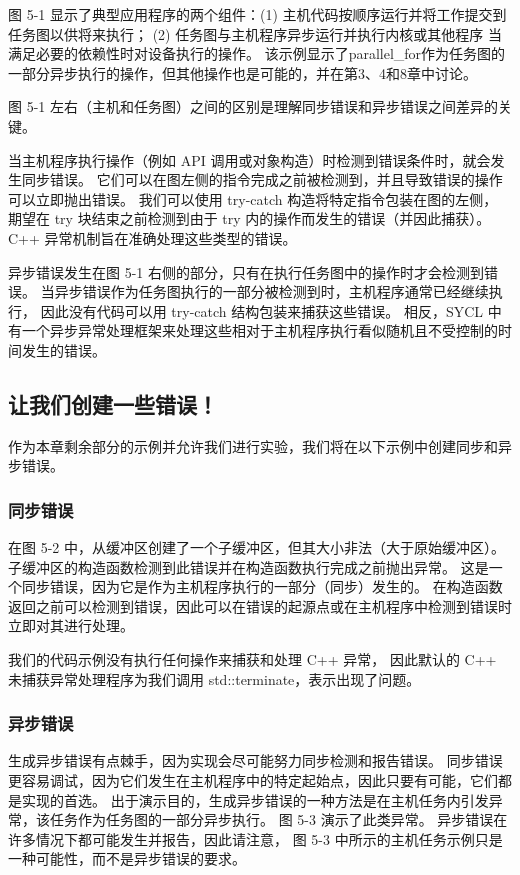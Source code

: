 图 5-1 显示了典型应用程序的两个组件：(1) 主机代码按顺序运行并将工作提交到任务图以供将来执行；
(2) 任务图与主机程序异步运行并执行内核或其他程序 当满足必要的依赖性时对设备执行的操作。 
该示例显示了parallel\_for作为任务图的一部分异步执行的操作，但其他操作也是可能的，并在第3、4和8章中讨论。

图 5-1 左右（主机和任务图）之间的区别是理解同步错误和异步错误之间差异的关键。

当主机程序执行操作（例如 API 调用或对象构造）时检测到错误条件时，就会发生同步错误。 
它们可以在图左侧的指令完成之前被检测到，并且导致错误的操作可以立即抛出错误。 
我们可以使用 try-catch 构造将特定指令包装在图的左侧，
期望在 try 块结束之前检测到由于 try 内的操作而发生的错误（并因此捕获）。 
C++ 异常机制旨在准确处理这些类型的错误。

异步错误发生在图 5-1 右侧的部分，只有在执行任务图中的操作时才会检测到错误。 
当异步错误作为任务图执行的一部分被检测到时，主机程序通常已经继续执行，
因此没有代码可以用 try-catch 结构包装来捕获这些错误。 
相反，SYCL 中有一个异步异常处理框架来处理这些相对于主机程序执行看似随机且不受控制的时间发生的错误。

\subsection{让我们创建一些错误！}
作为本章剩余部分的示例并允许我们进行实验，我们将在以下示例中创建同步和异步错误。

\subsubsection{同步错误}
在图 5-2 中，从缓冲区创建了一个子缓冲区，但其大小非法（大于原始缓冲区）。 
子缓冲区的构造函数检测到此错误并在构造函数执行完成之前抛出异常。 
这是一个同步错误，因为它是作为主机程序执行的一部分（同步）发生的。 
在构造函数返回之前可以检测到错误，因此可以在错误的起源点或在主机程序中检测到错误时立即对其进行处理。

我们的代码示例没有执行任何操作来捕获和处理 C++ 异常，
因此默认的 C++ 未捕获异常处理程序为我们调用 std::terminate，表示出现了问题。

\subsubsection{异步错误}
生成异步错误有点棘手，因为实现会尽可能努力同步检测和报告错误。 
同步错误更容易调试，因为它们发生在主机程序中的特定起始点，因此只要有可能，它们都是实现的首选。 
出于演示目的，生成异步错误的一种方法是在主机任务内引发异常，该任务作为任务图的一部分异步执行。 
图 5-3 演示了此类异常。 异步错误在许多情况下都可能发生并报告，因此请注意，
图 5-3 中所示的主机任务示例只是一种可能性，而不是异步错误的要求。


